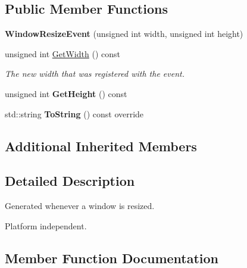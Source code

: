 \subsection*{Public Member Functions}
\begin{DoxyCompactItemize}
\item 
\mbox{\label{classengine_1_1events_1_1WindowResizeEvent_ab3b3376d2bc9f18505798fc73ef35313}} 
{\bfseries Window\+Resize\+Event} (unsigned int width, unsigned int height)
\item 
unsigned int \hyperlink{classengine_1_1events_1_1WindowResizeEvent_a0858a751bbb0a18846c7377dbbe3d977}{Get\+Width} () const
\begin{DoxyCompactList}\small\item\em The new width that was registered with the event. \end{DoxyCompactList}\item 
\mbox{\label{classengine_1_1events_1_1WindowResizeEvent_a1bde757195dac342cc7c1e1e8368a068}} 
unsigned int {\bfseries Get\+Height} () const
\item 
\mbox{\label{classengine_1_1events_1_1WindowResizeEvent_a7b51e15132e30f7e45cd045031a56afb}} 
std\+::string {\bfseries To\+String} () const override
\end{DoxyCompactItemize}
\subsection*{Additional Inherited Members}


\subsection{Detailed Description}
Generated whenever a window is resized. 

Platform independent. 

\subsection{Member Function Documentation}
\mbox{\label{classengine_1_1events_1_1WindowResizeEvent_a0858a751bbb0a18846c7377dbbe3d977}} 
